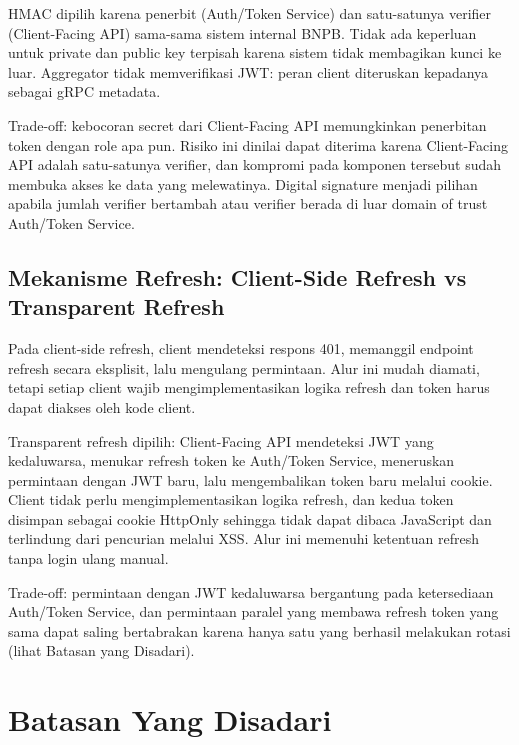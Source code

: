 HMAC dipilih karena penerbit (Auth/Token Service) dan satu-satunya verifier (Client-Facing API) sama-sama sistem internal BNPB. Tidak ada keperluan untuk private dan public key terpisah karena sistem tidak membagikan kunci ke luar. Aggregator tidak memverifikasi JWT: peran client diteruskan kepadanya sebagai gRPC metadata.

Trade-off: kebocoran secret dari Client-Facing API memungkinkan penerbitan token dengan role apa pun. Risiko ini dinilai dapat diterima karena Client-Facing API adalah satu-satunya verifier, dan kompromi pada komponen tersebut sudah membuka akses ke data yang melewatinya. Digital signature menjadi pilihan apabila jumlah verifier bertambah atau verifier berada di luar domain of trust Auth/Token Service.

\subsection{Mekanisme Refresh: Client-Side Refresh vs Transparent Refresh}

Pada client-side refresh, client mendeteksi respons 401, memanggil endpoint refresh secara eksplisit, lalu mengulang permintaan. Alur ini mudah diamati, tetapi setiap client wajib mengimplementasikan logika refresh dan token harus dapat diakses oleh kode client.

Transparent refresh dipilih: Client-Facing API mendeteksi JWT yang kedaluwarsa, menukar refresh token ke Auth/Token Service, meneruskan permintaan dengan JWT baru, lalu mengembalikan token baru melalui cookie. Client tidak perlu mengimplementasikan logika refresh, dan kedua token disimpan sebagai cookie HttpOnly sehingga tidak dapat dibaca JavaScript dan terlindung dari pencurian melalui XSS. Alur ini memenuhi ketentuan refresh tanpa login ulang manual.

Trade-off: permintaan dengan JWT kedaluwarsa bergantung pada ketersediaan Auth/Token Service, dan permintaan paralel yang membawa refresh token yang sama dapat saling bertabrakan karena hanya satu yang berhasil melakukan rotasi (lihat Batasan yang Disadari).

\section{Batasan Yang Disadari}

